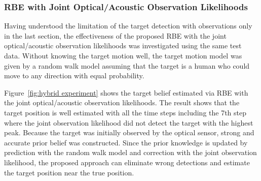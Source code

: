 \subsubsection{RBE with Joint Optical/Acoustic Observation Likelihoods}
Having understood the limitation of the target detection with observations only in the last section, the effectiveness of the proposed RBE with the joint optical/acoustic observation likelihoods was investigated using the same test data.  Without knowing the target motion well, the target motion model was given by a random walk model assuming that the target is a human who could move to any direction with equal probability.  

Figure~\ref{fig:hybrid experiment} shows the target belief estimated via RBE with the joint optical/acoustic observation likelihoods.  The result shows that the target position is well estimated with all the time steps including the 7th step where the joint observation likelihood did not detect the target with the highest peak.  Because the target was initially observed by the optical sensor, strong and accurate prior belief was constructed.  Since the prior knowledge is updated by prediction with the random walk model and correction with the joint observation likelihood, the proposed approach can eliminate wrong detections and estimate the target position near the true position.  

